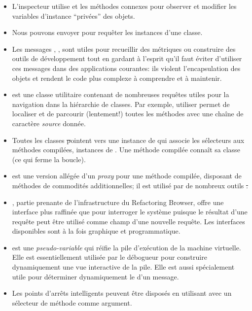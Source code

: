 \documentclass[a4paper,10pt,twoside]{book}
\begin{document}
{\begin{itemize}
\item L'inspecteur utilise  et les méthodes connexes pour observer et modifier les variables d'instance ``privées'' des objets.
\item Nous pouvons envoyer  pour requêter les instances d'une classe.
\item Les messages , , \etc sont utiles pour recueillir des métriques ou construire des outils de développement tout en gardant à l'esprit qu'il faut éviter d'utiliser ces messages dans des applications courantes: ils violent l'encapsulation des objets et rendent le code plus complexe à comprendre et à maintenir.
\item {} est une classe utilitaire contenant de nombreuses requêtes utiles pour la navigation dans la hiérarchie de classes. Par exemple, utiliser  permet de localiser et de parcourir (lentement!) toutes les méthodes avec une chaîne de caractère \emph{source} donnée.
\item Toutes les classes \st pointent vers une instance de  qui associe les sélecteurs aux méthodes compilées, instances de . Une méthode compilée connaît sa classe (ce qui ferme la boucle).
\item {} est une version allégée d'un \emph{proxy} pour une méthode compilée, disposant de méthodes de commodités additionnelles; il est utilisé par de nombreux outils \st.
\item {}, partie prenante de l'infrastructure du Refactoring Browser, offre une interface plus raffinée que  pour interroger le système puisque le résultat d'une requête peut être utilisé comme champ d'une nouvelle requête. Les interfaces disponibles sont à la fois graphique et programmatique.
\item {} est une \emph{pseudo-variable} qui réifie la pile d'exécution de la machine virtuelle. Elle est essentiellement utilisée par le débogueur pour construire dynamiquement une vue interactive de la pile. Elle est aussi spécialement utile pour déterminer dynamiquement le \sender d'un message.
\item Les points d'arrêts intelligents peuvent être disposés en utilisant  avec un sélecteur de méthode comme argument.

\end{itemize}}
\end{document}
